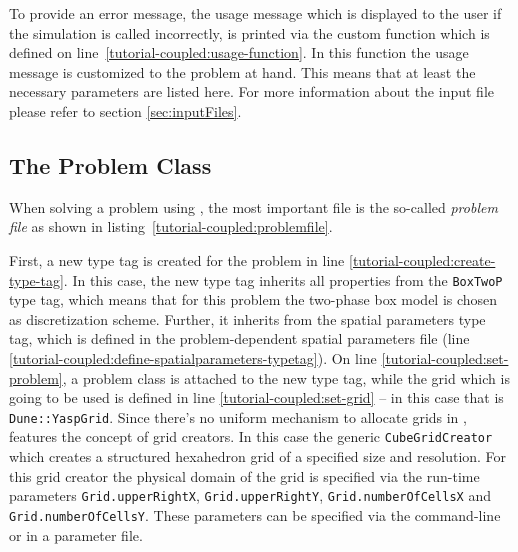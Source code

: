 \begin{lst}\label{tutorial-coupled:parameter-file} \mbox{}

\end{lst}

To provide an error message, the usage message which is displayed to
the user if the simulation is called incorrectly, is printed via the
custom function which is defined on
line~\ref{tutorial-coupled:usage-function}. 
In this function the usage message is customized to the problem at hand. 
This means that at least the necessary parameters are listed here.  
For more information about the input file please refer to section \ref{sec:inputFiles}.


\subsection{The Problem Class}

When solving a problem using \Dumux, the most important file is the
so-called \textit{problem file} as shown in
listing~\ref{tutorial-coupled:problemfile}.

\begin{lst}\label{tutorial-coupled:problemfile} \mbox{}

\end{lst}

First, a new type tag is created for the problem in line
\ref{tutorial-coupled:create-type-tag}.  In this case, the new type
tag inherits all properties from the \texttt{BoxTwoP} type tag, which
means that for this problem the two-phase box model is chosen as
discretization scheme. Further, it inherits from the spatial
parameters type tag, which is defined in the problem-dependent spatial
parameters file (line
\ref{tutorial-coupled:define-spatialparameters-typetag}).  On line
\ref{tutorial-coupled:set-problem}, a problem class is attached to the
new type tag, while the grid which is going to be used is defined in
line \ref{tutorial-coupled:set-grid} -- in this case that is
\texttt{Dune::YaspGrid}.  Since there's no uniform mechanism to
allocate grids in \Dune, \Dumux features the concept of grid creators.
In this case the generic \texttt{CubeGridCreator} which creates a
structured hexahedron grid of a specified size and resolution. For
this grid creator the  physical domain of the grid is specified via the
run-time parameters \texttt{Grid.upperRightX},
\texttt{Grid.upperRightY}, \texttt{Grid.numberOfCellsX} and
\texttt{Grid.numberOfCellsY}. These parameters can be specified via
the command-line or in a parameter file.

